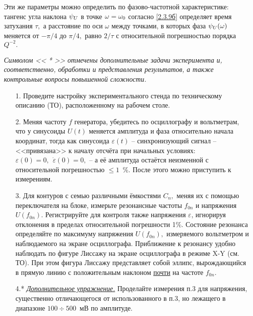 Эти же параметры можно определить по фазово-частотной характеристике: тангенс угла наклона $\psi_{\sc{U}}$ в точке $\omega=\omega_{\sc{0}}$ согласно \eqref{2.3.9б} определяет время затухания $\tau,$ а расстояние по оси $\omega$ между точками, в которых фаза $\psi_{\sc{U}}(\omega)$ меняется от $-\pi/4$ до $\pi/4,$ равно $2/\tau$ с относитель\-ной погрешностью порядка $Q^{-2}.$




\begin{lab:task}
\emph{Символом << * >> отмечены дополнительные задачи эксперимента и, соответственно, обработки и представления результатов, а также контрольные вопросы повышенной сложности.}
	\begin{enumerate}
    \item[1.] Проведите настройку экспериментального стенда по техническому описанию (ТО), расположенному на рабочем столе.

    \item[2.] Меняя частоту $f$ генератора, убедитесь по осциллографу и вольтметрам, что у синусоиды $U(t)$ меняется амплитуда и фаза относительно начала координат, тогда как синусоида $\varepsilon(t)$ – синхронизующий сигнал – <<привязана>> к началу отсчёта при начальных условиях: $\varepsilon(0)=0,~~\dot{\varepsilon}(0)=0,$ – а её амплитуда остаётся неизменной с относительной погрешностью  $\le1$~\%. После этого можно приступить к измерениям.

    \item[3.] Для контуров с семью различными ёмкостями $C_n,$ меняя их с помощью переключателя на блоке, измерьте резонансные частоты $f_{0n}$ и напряжения $U(f_{0n}).$ Регистрируйте для контроля также напряжения $\varepsilon$, игнорируя отклонения в пределах относительной погрешности 1\%. Состояние резонанса определяйте по максимуму напряжения $U(f_{0n}),$ измеряемого вольтметром и наблюдаемого на экране осциллографа. Приближение к резонансу удобно наблюдать по фигуре Лиссажу на экране осциллографа в режиме X-Y (см. ТО). При этом фигура Лиссажу представляет собой эллипс, вырождающийся в прямую линию с положительным наклоном \underline{почти} на частоте $f_{0n}.$

    \item[4.*] \emph{\underline{Дополнительное упражнение.}} Проделайте измерения п.3 для напряжения, существенно отличающегося от использованного в п.3, но лежащего в диапазоне $100\div500$~мВ по амплитуде.


\end{enumerate}
\end{lab:task}
